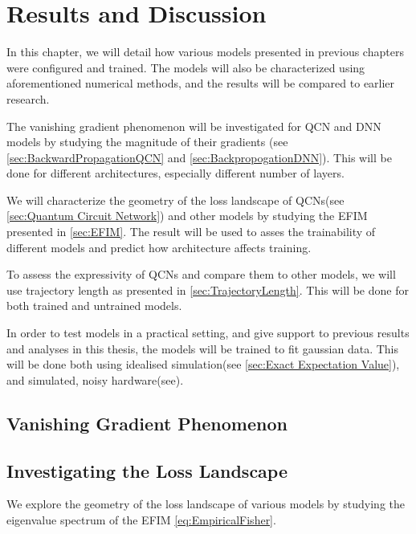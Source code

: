 \chapter{Results and Discussion}\label{chap:results_discussion}
In this chapter, we will detail how various models presented in previous chapters were configured and trained. The models will also be characterized using aforementioned numerical methods, and the results will be compared to earlier research.

The vanishing gradient phenomenon will be investigated for QCN and DNN models by studying the magnitude of their gradients (see \autoref{sec:BackwardPropagationQCN} and \autoref{sec:BackpropogationDNN}). This will be done for different architectures, especially different number of layers.

We will characterize the geometry of the loss landscape of QCNs(see \autoref{sec:Quantum Circuit Network}) and other models by studying the EFIM presented in \autoref{sec:EFIM}. The result will be used to asses the trainability of different models and predict how architecture affects training.

To assess the expressivity of QCNs and compare them to other models, we will use trajectory length as presented in \autoref{sec:TrajectoryLength}. This will be done for both trained and untrained models.

In order to test models in a practical setting, and give support to previous results and analyses in this thesis, the models will be trained to fit gaussian data. This will be done both using idealised simulation(see \autoref{sec:Exact Expectation Value}), and simulated, noisy hardware(see).


\section{Vanishing Gradient Phenomenon}\label{sec:Vanishing Gradient Phenomenon}


\section{Investigating the Loss Landscape}\label{sec:Investigating the Loss Landscape}
We explore the geometry of the loss landscape of various models by studying the eigenvalue spectrum of the EFIM \autoref{eq:EmpiricalFisher}. 


